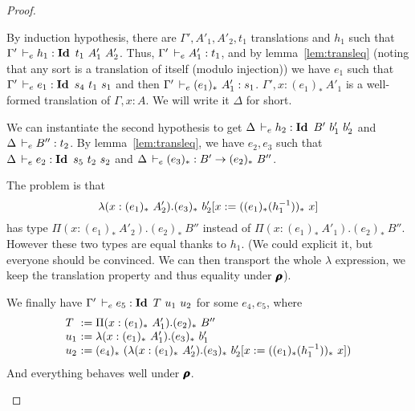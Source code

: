 \documentclass[a4paper,english]{lipics-utf8x}
\begin{document}
\begin{proof}
\begin{caselist}
      \nextcase
      \begin{mathc}
      \end{mathc}
      By induction hypothesis, there are $\Gamma',A'_1,A'_2,t_1$ translations
      and $h_1$ such that $\Gamma' \,\vdash_e h_1 : \operatorname{\mathbf{Id}~} t_1\ A'_1\ A'_2$.
      Thus, $\Gamma' \,\vdash_e A'_1 : t_1$, and by lemma~\ref{lem:transleq}
      (noting that any sort is a translation of itself (modulo injection))
      we have $e_1$ such that $\Gamma' \,\vdash_e e_1 : \operatorname{\mathbf{Id}~} s_4\ t_1\ s_1$ and
      then $\Gamma' \,\vdash_e (e_1)_*\ A'_1 : s_1$.
      $\Gamma', x : (e_1)_*\ A'_1$ is a well-formed translation of
      $\Gamma, x:A$. We will write it $\Delta$ for short.

      We can instantiate the second hypothesis to get
      $\Delta \,\vdash_e h_2 : \operatorname{\mathbf{Id}~} B'\ b'_1\ b'_2$ and $\Delta \,\vdash_e B'' : t_2$.
      By lemma~\ref{lem:transleq}, we have $e_2,e_3$ such that
      $\Delta \,\vdash_e e_2 : \operatorname{\mathbf{Id}~} s_5\ t_2\ s_2$ and
      $\Delta \,\vdash_e (e_3)_* : B' \to (e_2)_*\ B''$.

      The problem is that
      \[
        \lambda (x : (e_1)_*\ A'_2). (e_3)_*\ %
        b'_2[x := ((e_1)_* (h_1\inv))_*\ x]
      \]
      has type
      $\Pi (x : (e_1)_*\ A'_2). (e_2)_*\ B''$ instead of
      $\Pi (x : (e_1)_*\ A'_1). (e_2)_*\ B''$.
      However these two types are equal thanks to $h_1$.
      (We could explicit it, but everyone should be convinced. We can then
      transport the whole $\lambda$ expression, we keep the translation
      property and thus equality under $\operatorname{\pmb{\bm{\rho}}}$).

      We finally have
      $\Gamma' \,\vdash_e e_5 : \operatorname{\mathbf{Id}~} T\ u_1\ u_2$ for some $e_4,e_5$,
      where
      \[
        \begin{array}{l@{~}l}
          T   &:= \Pi (x : (e_1)_*\ A'_1). (e_2)_*\ B'' \\
          u_1 &:= \lambda (x : (e_1)_*\ A'_1). (e_3)_*\ b'_1 \\
          u_2 &:= (e_4)_*\ %
                   (\lambda (x : (e_1)_*\ A'_2).
                    (e_3)_*\ b'_2[x := ((e_1)_* (h_1\inv))_*\ x])
        \end{array}
      \]
      And everything behaves well under $\operatorname{\pmb{\bm{\rho}}}$.


\end{caselist}
\end{proof}
\end{document}
